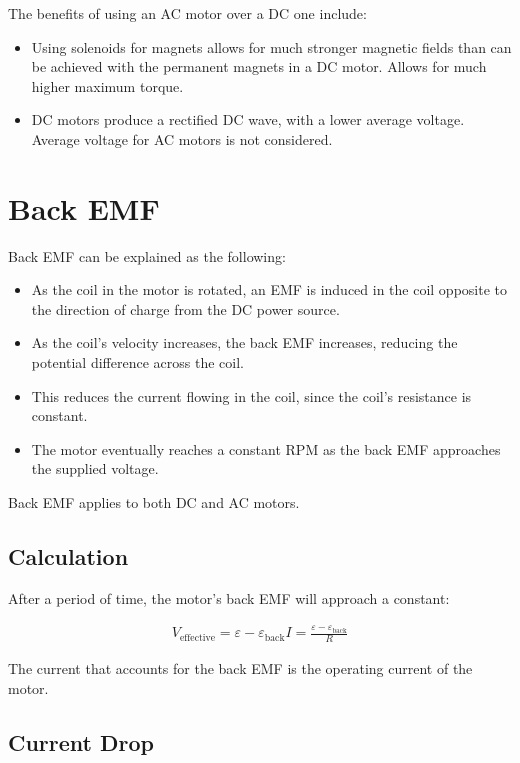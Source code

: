 \documentclass[a4paper,11pt]{article}
\begin{document}
The benefits of using an AC motor over a DC one include:

\begin{itemize}
\item Using solenoids for magnets allows for much stronger magnetic fields than
	can be achieved with the permanent magnets in a DC motor. Allows for much
	higher maximum torque.
\item DC motors produce a rectified DC wave, with a lower average voltage.
	Average voltage for AC motors is not considered.
\end{itemize}




\section{Back EMF}

Back EMF can be explained as the following:

\begin{itemize}
\item As the coil in the motor is rotated, an EMF is induced in the coil
	opposite to the direction of charge from the DC power source.
\item As the coil's velocity increases, the back EMF increases, reducing the
	potential difference across the coil.
\item This reduces the current flowing in the coil, since the coil's resistance
	is constant.
\item The motor eventually reaches a constant RPM as the back EMF approaches
	the supplied voltage.
\end{itemize}

Back EMF applies to both DC and AC motors.


\subsection{Calculation}

After a period of time, the motor's back EMF will approach a constant:

$$
\begin{aligned}
V_{\mbox{effective}} = \varepsilon - \varepsilon_{\mbox{back}}
I = \frac{\varepsilon - \varepsilon_{\mbox{back}}}{R}
\end{aligned}
$$

The current that accounts for the back EMF is the operating current of the
motor.


\subsection{Current Drop}
\end{document}

